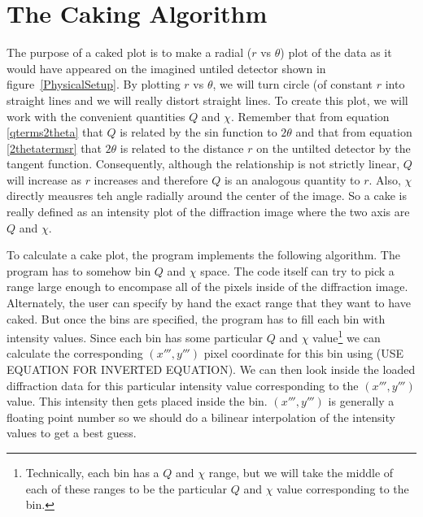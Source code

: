 \section{The Caking Algorithm}

The purpose of a caked plot is to make a radial 
($r$ vs $\theta$) plot of the data as it would have 
appeared on the imagined untiled detector shown in 
figure~\ref{PhysicalSetup}. By plotting $r$ vs $\theta$,
we will turn circle (of constant $r$ into straight lines 
and we will really distort straight lines.
To create this plot, we will work with the 
convenient quantities $Q$ and $\chi$. Remember that
from equation \ref{qterms2theta} that $Q$ is
related by the sin function to $2\theta$ and that
from equation \ref{2thetatermsr} that $2\theta$
is related to the distance $r$ on the untilted 
detector by the tangent function. 
Consequently, although the relationship is not 
strictly linear, $Q$ will increase as $r$ increases
and therefore $Q$ is an analogous quantity to $r$.
Also, $\chi$ directly meausres teh angle radially
around the center of the image. So a cake is really
defined as an intensity plot of the diffraction 
image where the two axis are $Q$ and $\chi$.

To calculate a cake plot, the program implements
the following algorithm. The program has to somehow bin $Q$ and 
$\chi$ space. The code itself can try to pick
a range large enough to encompase all of the 
pixels inside of the diffraction image. Alternately,
the user can specify by hand the exact range that
they want to have caked. But once the bins are
specified, the program has to fill each bin with
intensity values. Since each bin has some 
particular $Q$ and $\chi$ value\footnote{Technically,
each bin has a $Q$ and $\chi$ range, but we will
take the middle of each of these ranges to be the
particular $Q$ and $\chi$ value corresponding to the
bin.} we can calculate the corresponding $(x''',y''')$
pixel coordinate for this bin using 
(USE EQUATION FOR INVERTED EQUATION). We can then
look inside the loaded diffraction data for
this particular intensity value corresponding
to the $(x''',y''')$ value. This intensity then
gets placed inside the bin. $(x''',y''')$
is generally a floating point number so we should
do a bilinear interpolation of the intensity values
to get a best guess.

